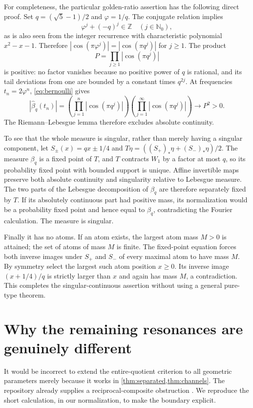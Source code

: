 \documentclass[11pt,letterpaper]{article}
\theoremstyle{definition}
\theoremstyle{remark}
\newcommand{\N}{\mathbb N_0}
\newcommand{\Z}{\mathbb Z}
\numberwithin{equation}{section}
\begin{document}
For completeness, the particular golden-ratio assertion has the following direct proof. Set $q=(\sqrt5-1)/2$ and $\varphi=1/q$. The conjugate relation implies
\[
 \varphi^j+(-q)^j\in\Z\quad(j\in\N),
\]
as is also seen from the integer recurrence with characteristic polynomial $x^2-x-1$. Therefore
$|\cos(\pi\varphi^j)|=|\cos(\pi q^j)|$ for $j\ge1$. The product
\[
 P=\prod_{j\ge1}|\cos(\pi q^j)|
\]
is positive: no factor vanishes because no positive power of $q$ is rational, and its tail deviations from one are bounded by a constant times $q^{2j}$. At frequencies $t_n=2\varphi^n$, \eqref{eq:bernoulli} gives
\[
 |\widehat\beta_q(t_n)|
 =\left(\prod_{j=1}^{n}|\cos(\pi q^j)|\right)
   \left(\prod_{j=1}^{\infty}|\cos(\pi q^j)|\right)
 \longrightarrow P^2>0.
\]
The Riemann--Lebesgue lemma therefore excludes absolute continuity.

To see that the whole measure is singular, rather than merely having a singular component, let $S_\pm(x)=qx\pm1/4$ and
$T\eta=((S_+)_*\eta+(S_-)_*\eta)/2$. The measure $\beta_q$ is a fixed point of $T$, and $T$ contracts $W_1$ by a factor at most $q$, so its probability fixed point with bounded support is unique. Affine invertible maps preserve both absolute continuity and singularity relative to Lebesgue measure. The two parts of the Lebesgue decomposition of $\beta_q$ are therefore separately fixed by $T$. If its absolutely continuous part had positive mass, its normalization would be a probability fixed point and hence equal to $\beta_q$, contradicting the Fourier calculation. The measure is singular.

Finally it has no atoms. If an atom exists, the largest atom mass $M>0$ is attained; the set of atoms of mass $M$ is finite. The fixed-point equation forces both inverse images under $S_+$ and $S_-$ of every maximal atom to have mass $M$. By symmetry select the largest such atom position $x\ge0$. Its inverse image $(x+1/4)/q$ is strictly larger than $x$ and again has mass $M$, a contradiction. This completes the singular-continuous assertion without using a general pure-type theorem.

\section{Why the remaining resonances are genuinely different}\label{sec:limits}
It would be incorrect to extend the entire-quotient criterion to all geometric parameters merely because it works in \cref{thm:separated,thm:channels}. The repository already supplies a reciprocal-composite obstruction \cite{repo-hall}. We reproduce the short calculation, in our normalization, to make the boundary explicit.
\end{document}
